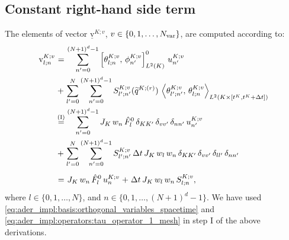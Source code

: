 \documentclass{scrreprt}
\theoremstyle{definition}
\theoremstyle{nonumberplain}
\newcommand{\laVec}[1]{\underline{\mathrm{#1}}}
\newcommand{\laVecel}[1]{\mathrm{#1}}
\newcommand{\cell}{K}
\newcommand{\detJ}{J_\cell}
\begin{document}
\subsection{Constant right-hand side term}
The elements of vector
$\laVec{v}^{\cell;v}$, $v\in\{0,1,\ldots,N_\textup{var}\}$, are computed
according to:
\begin{align*}
\laVecel{v}^{\cell;v}_{l;n}
&
\overset{\phantom{\textup{(I)}}}{=}
\sum_{n'=0}^{(N+1)^{d}-1}
\left[\theta^{\cell;v}_{l;n},\,\phi^{\cell;v}_{n'}\right]^{0}_{L^2(\cell)}
\,
u^{\cell;v}_{n'}
\\
&
\overset{\phantom{\textup{(I)}}}{+}
\sum_{l'=0}^{N}
\sum_{n'=0}^{(N+1)^{d}-1}
S^{\cell;v}_{l';n'}
(\widetilde{q}^{\cell;(r)})
\,
\left\langle
\theta^{\cell;v}_{l';n'},\,
\theta^{\cell;v}_{l;n}
\right\rangle
_{L^2(\cell\times[t^\cell,t^\cell+\Delta t])}
\\
&\overset{\textup{(I)}}=
\sum_{n'=0}^{(N+1)^{d}-1}
\detJ\,
w_{n}\,
\hat{F}^0_l\,
\delta_{\cell\cell'}\,\delta_{vv'}\,
\delta_{n n'}
\,
u^{\cell;v}_{n'}
\\
&
\overset{\phantom{\textup{(I)}}}{+}
\sum_{l'=0}^{N}
\sum_{n'=0}^{(N+1)^{d}-1}
S^{\cell;v}_{l';n'}\,
\Delta t\,\detJ\,w_{l}\,w_{n}\,
\delta_{\cell\cell'}\,\delta_{vv'}\,\delta_{l l'}\,\delta_{n n'}
\\
&
\overset{\phantom{\textup{(I)}}}{=}
\detJ\,
w_{n}\,
\hat{F}^0_l\,
u^{\cell;v}_{n}
\overset{\phantom{\textup{(I)}}}{+}
\Delta t\,\detJ\,w_{l}\,w_{n}\,
S^{\cell;v}_{l;n},
\end{align*}
where $l\in\{0,1,\ldots,N\}$, and
$n\in\{0,1,\ldots,(N+1)^{d}-1\}$.
We have used
\eqref{eq:ader_impl:basis:orthogonal_variables_spacetime}
and
\eqref{eq:ader_impl:operators:tau_operator_1_mesh}
in step I of the above derivations.
\end{document}
